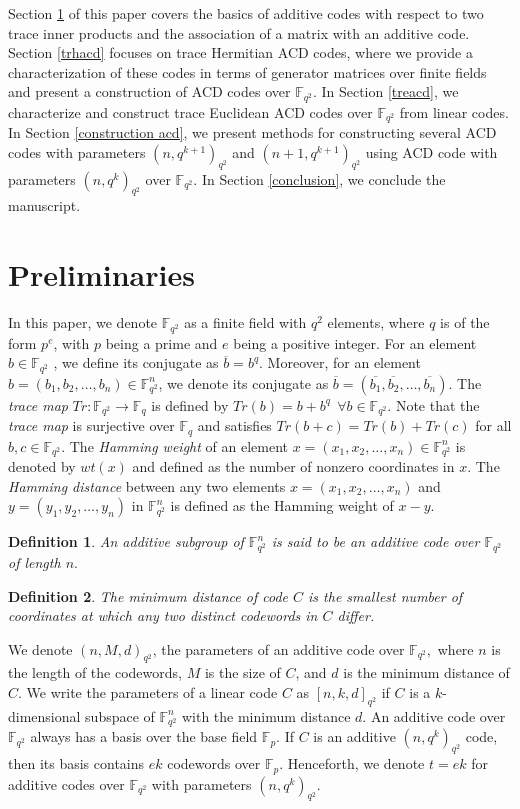 \documentclass[sn-mathphys-num]{sn-jnl}%
\theoremstyle{thmstyleone}%
\theoremstyle{thmstyletwo}%
\theoremstyle{thmstylethree}%
\newtheorem{definition}{Definition}%
\begin{document}
Section \ref{pre} of this paper covers the basics of additive codes with respect to two trace inner products and the association of a matrix with an additive code. Section \ref{trhacd} focuses on trace Hermitian ACD codes, where we provide a characterization of these codes in terms of generator matrices over finite fields and present a construction of ACD codes over $\mathbb{F}_{q^2}$. In Section \ref{treacd}, we characterize and construct trace Euclidean ACD codes over $\mathbb{F}_{q^2}$ from linear codes. In Section \ref{construction acd}, we present methods for constructing several ACD codes with parameters $(n,q^{k+1})_{q^2}$ and $(n+1,q^{k+1})_{q^2}$ using ACD code with parameters $(n,q^k)_{q^2}$ over $\mathbb{F}_{q^2}$. In Section \ref{conclusion}, we conclude the manuscript. 

\section{Preliminaries}\label{pre}
In this paper, we denote $\mathbb{F}_{q^2}$  as a finite field with $q^2$  elements, where $q$ is of the form $p^e$, with $p$ being a prime and $e$ being a positive integer. For an element $b \in \mathbb{F}_{q^2}$ , we define its conjugate as $\overline{b}=b^q$. Moreover, for an element $b=(b_1,b_2,\dots,b_n)\in \mathbb{F}_{q^2}^n$, we denote its conjugate as $\overline{b}=(\overline{b_1},\overline{b_2},\dots,\overline{b_n}).$ The \textit{trace map} $Tr: \mathbb{F}_{q^2} \to \mathbb{F}_{q}$ is defined by 
$Tr(b)=b+b^q\ \  \forall b\in \mathbb{F}_{q^2} .$ Note that the \textit{trace map} is surjective over $\mathbb{F}_{q}$ and satisfies $Tr(b+c)=Tr(b)+Tr(c)$ for all $b,c\in \mathbb{F}_{q^2}. $  The \textit{Hamming weight} of an element $x=(x_1,x_2,\dots,x_n)\in \mathbb{F}_{q^2}^n$  is denoted by $wt(x)$ and  defined as the number of nonzero coordinates in $x.$  The \textit{Hamming distance} between any two elements $x=(x_1,x_2,\dots,x_n)$ and $y=(y_1,y_2,\dots,y_n)$ in $\mathbb{F}_{q^2}^n$ is defined as the Hamming weight of $x-y.$

\begin{definition}
	An additive subgroup of $\mathbb{F}_{q^2}^n$ is said to be an additive code over $\mathbb{F}_{q^2}$ of length $n.$
\end{definition}
\begin{definition}
	The minimum distance of code $C$ is the smallest number of coordinates at which any two distinct codewords in $C$ differ.
\end{definition}
We denote $(n, M,d)_{q^2}$, the parameters of an additive code over $\mathbb{F}_{q^2},$ where $n$ is the length of the codewords, $M$ is the size of $C$, and $d$ is the minimum distance of $C$.  We write the parameters of a linear code $C$ as $[n,k,d]_{q^2}$  if $C$ is a $k$-dimensional subspace of $\mathbb{F}_{q^2}^n$ with the minimum distance $d.$
An additive code over $\mathbb{F}_{q^2}$  always has a basis over the base field $\mathbb{F}_p.$ If $C$ is an additive $(n,q^{k})_{q^2}$ code, then its basis contains $ek$ codewords over $\mathbb{F}_p$. Henceforth, we denote $t=ek$ for additive codes  over $\mathbb{F}_{q^2}$ with parameters $(n,q^k)_{q^2}.$
\end{document}
